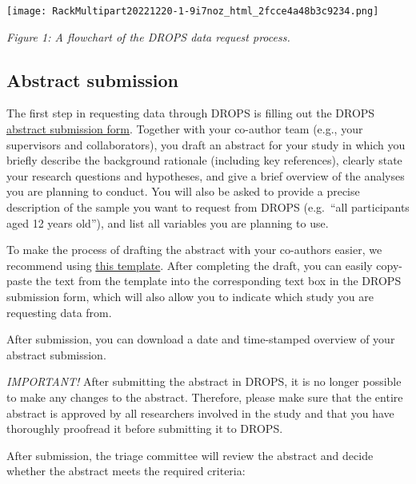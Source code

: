 \documentclass[
]{article}
\begin{document}
\texttt{[image: RackMultipart20221220-1-9i7noz\_html\_2fcce4a48b3c9234.png]}

\emph{Figure 1: A flowchart of the DROPS data request process.}

\hypertarget{section-2}{%
\subsection{}\label{section-2}}

\hypertarget{abstract-submission}{%
\subsection{Abstract submission}\label{abstract-submission}}

The first step in requesting data through DROPS is filling out the DROPS
\href{https://redcap.gbiomed.kuleuven.be/surveys/?s=WDYAFAHWK4}{abstract
submission form}. Together with your co-author team (e.g., your
supervisors and collaborators), you draft an abstract for your study in
which you briefly describe the background rationale (including key
references), clearly state your research questions and hypotheses, and
give a brief overview of the analyses you are planning to conduct. You
will also be asked to provide a precise description of the sample you
want to request from DROPS (e.g.~``all participants aged 12 years
old''), and list all variables you are planning to use.

To make the process of drafting the abstract with your co-authors
easier, we recommend using
\href{https://docs.google.com/document/d/1WmAHdhIU37RJest4ozNItDl_Ygml4BUomt8a_EJ8yNs/edit}{this
template}. After completing the draft, you can easily copy-paste the
text from the template into the corresponding text box in the DROPS
submission form, which will also allow you to indicate which study you
are requesting data from.

After submission, you can download a date and time-stamped overview of
your abstract submission.

\emph{IMPORTANT!} After submitting the abstract in DROPS, it is no
longer possible to make any changes to the abstract. Therefore, please
make sure that the entire abstract is approved by all researchers
involved in the study and that you have thoroughly proofread it before
submitting it to DROPS.

After submission, the triage committee will review the abstract and
decide whether the abstract meets the required criteria:
\end{document}
